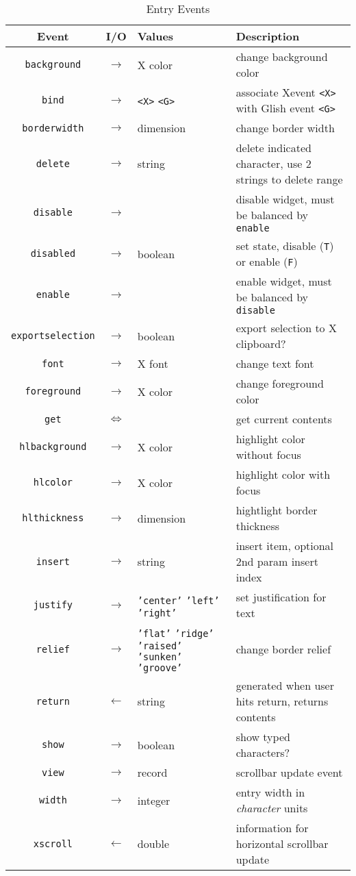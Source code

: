 \begin{table}[tbh]
{\small
\begin{center}
\begin{tabular}{|c|c|p{0.6in}|p{3.3in}|}
\hline
Event & I/O & Values & Description \\
\hline
\hline
{\tt background}&$\rightarrow$& X color & change background color \\ \hline
{\tt bind}	&$\rightarrow$&\verb+<X>+ \verb+<G>+& associate Xevent \verb+<X>+ with Glish event \verb+<G>+ \\ \hline
{\tt borderwidth}&$\rightarrow$& dimension & change border width \\ \hline
{\tt delete}	&$\rightarrow$&string& delete indicated character, use 2 strings to delete range \\ \hline
{\tt disable}&$\rightarrow$& & disable widget, must be balanced by {\tt enable} \\ \hline
{\tt disabled}	&$\rightarrow$& boolean & set state, disable ({\tt T}) or enable ({\tt F}) \\ \hline
{\tt enable}&$\rightarrow$& & enable widget, must be balanced by {\tt disable} \\ \hline
{\tt exportselection} &$\rightarrow$&boolean& export selection to X clipboard? \\ \hline
{\tt font}	&$\rightarrow$& X font & change text font \\ \hline
{\tt foreground}&$\rightarrow$& X color & change foreground color \\ \hline
{\tt get}	&$\Leftrightarrow$&& get current contents \\ \hline
{\tt hlbackground}&$\rightarrow$& X color & highlight color without focus \\ \hline
{\tt hlcolor}	&$\rightarrow$& X color & highlight color with focus \\ \hline
{\tt hlthickness}&$\rightarrow$& dimension & hightlight border thickness \\ \hline
{\tt insert}	&$\rightarrow$&string& insert item, optional 2nd param insert index \\ \hline
{\tt justify}	&$\rightarrow$& {\tt 'center'} {\tt 'left'} {\tt 'right'} & set justification for text \\ \hline
{\tt relief}	&$\rightarrow$& {\tt 'flat'} {\tt 'ridge'} {\tt 'raised'} {\tt 'sunken'} {\tt 'groove'} & change border relief \\ \hline
{\tt return}	&$\leftarrow$&string& generated when user hits return, returns contents \\ \hline
{\tt show}	&$\rightarrow$&boolean& show typed characters? \\ \hline
{\tt view}	&$\rightarrow$&record& scrollbar update event \\ \hline
{\tt width}	&$\rightarrow$&integer& entry width in {\em character} units \\ \hline
{\tt xscroll}	&$\leftarrow$&double& information for horizontal scrollbar update \\ \hline
\end{tabular}
\end{center}
}
\caption{ Entry Events }
\label{tkentry-events}
\end{table}

